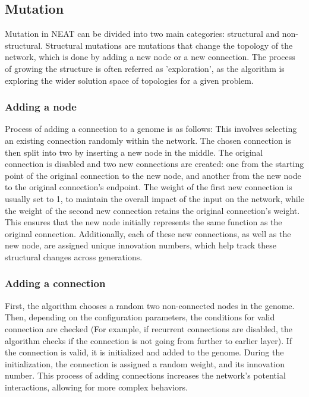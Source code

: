 \documentclass{article}
\begin{document}
\subsection{Mutation}
Mutation in NEAT can be divided into two main categories: structural and non-structural.
Structural mutations are mutations that change the topology of the network, which is done by adding a new node or a new connection. The process of growing
the structure is often referred as 'exploration', as the algorithm is exploring the wider solution space of topologies for a given problem.

\subsubsection{Adding a node}
Process of adding a connection to a genome is as follows:
This involves selecting an existing connection randomly within the network.
The chosen connection is then split into two by inserting a new node in the middle.
The original connection is disabled and two new connections are created: one from the starting point of the original connection to the new node,
and another from the new node to the original connection's endpoint. The weight of the first new connection is usually set to 1,
to maintain the overall impact of the input on the network, while the weight of the second new connection retains the original connection's weight.
This ensures that the new node initially represents the same function as the original connection. Additionally, each of these new connections,
as well as the new node, are assigned unique innovation numbers, which help track these structural changes across generations. 

\subsubsection{Adding a connection}
First, the algorithm chooses a random two non-connected nodes in the genome. Then, depending on the configuration parameters, the conditions for valid connection
are checked (For example, if recurrent connections are disabled, the algorithm checks if the connection is not going from further to earlier layer). 
If the connection is valid, it is initialized and added to the genome. During the initialization, the connection is assigned a random weight, and its innovation
number.
This process of adding connections increases the network's potential interactions, allowing for more complex behaviors.
\end{document}
